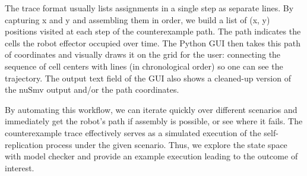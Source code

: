 The trace format usually lists assignments in 
a single step as separate lines.
By capturing x and y and assembling them in order, we build a list of 
(x, y) positions visited at each step of the counterexample path. 
The path indicates the cells the robot effector occupied 
over time.
The Python GUI then takes this path of coordinates and visually 
draws it on the grid for the user: connecting the sequence of cell centers 
with lines (in chronological order) so one can see the trajectory. 
The output text field of the GUI also shows a cleaned-up version of 
the nuSmv output and/or the path coordinates.

By automating this workflow, we can iterate quickly over different scenarios 
and immediately get the robot’s path if assembly is possible, or see 
where it fails. The counterexample trace effectively serves as a simulated 
execution of the self-replication process under the given scenario. 
Thus, we explore the state space with model checker  and provide an 
example execution leading to the outcome of interest.






